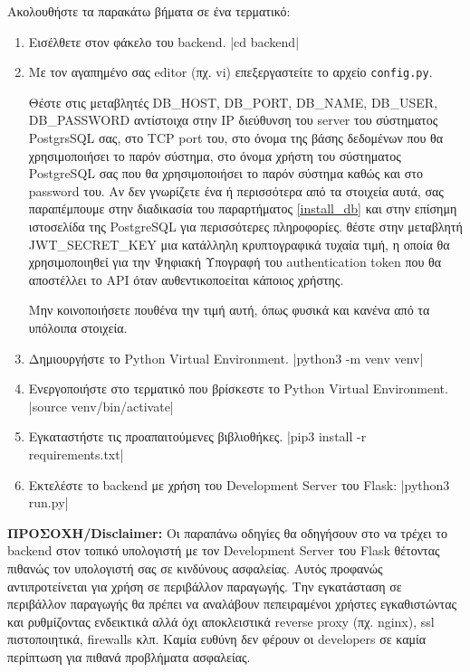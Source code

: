 \documentclass[a4paper]{article}
\begin{document}
\par Ακολουθήστε τα παρακάτω βήματα σε ένα τερματικό:
\begin{enumerate}
    \item Εισέλθετε στον φάκελο του backend.
        |cd backend|
    \item Με τον αγαπημένο σας editor (πχ. vi) επεξεργαστείτε το αρχείο \texttt{config.py}.
        \par Θέστε στις μεταβλητές DB\_HOST, DB\_PORT, DB\_NAME, DB\_USER, DB\_PASSWORD αντίστοιχα στην IP διεύθυνση του server του σύστηματος PostgrsSQL σας, στο TCP port του, στο όνομα της βάσης δεδομένων που θα χρησιμοποιήσει το παρόν σύστημα, στο όνομα χρήστη του σύστηματος PostgreSQL σας που θα χρησιμοποιήσει το παρόν σύστημα καθώς και στο password του. Αν δεν γνωρίζετε ένα ή περισσότερα από τα στοιχεία αυτά, σας παραπέμπουμε στην διαδικασία του παραρτήματος \ref{install_db} και στην επίσημη ιστοσελίδα της PostgreSQL για περισσότερες πληροφορίες.
         θέστε στην μεταβλητή JWT\_SECRET\_KEY μια κατάλληλη κρυπτογραφικά τυχαία τιμή, η οποία θα χρησιμοποιηθεί για την Ψηφιακή Υπογραφή του authentication token που θα αποστέλλει το API όταν αυθεντικοποείται κάποιος χρήστης.
        \par Μην κοινοποιήσετε πουθένα την τιμή αυτή, όπως φυσικά και κανένα από τα υπόλοιπα στοιχεία.
    \item Δημιουργήστε το Python Virtual Environment.
        |python3 -m venv venv|
    \item Ενεργοποιήστε στο τερματικό που βρίσκεστε το Python Virtual Environment.
        |source venv/bin/activate|
    \item Εγκαταστήστε τις προαπαιτούμενες βιβλιοθήκες.
        |pip3 install -r requirements.txt|
    \item Εκτελέστε το backend με χρήση του Development Server του Flask:
        |python3 run.py|
\end{enumerate}

\textbf{ΠΡΟΣΟΧΗ/Disclaimer:} Οι παραπάνω οδηγίες θα οδηγήσουν στο να τρέχει το backend στον τοπικό υπολογιστή με τον Development Server του Flask θέτοντας πιθανώς τον υπολογιστή σας σε κινδύνους ασφαλείας. Αυτός προφανώς αντιπροτείνεται για χρήση σε περιβάλλον παραγωγής. Την εγκατάσταση σε περιβάλλον παραγωγής θα πρέπει να αναλάβουν πεπειραμένοι χρήστες εγκαθιστώντας και ρυθμίζοντας ενδεικτικά αλλά όχι αποκλειστικά reverse proxy (πχ. nginx), ssl πιστοποιητικά, firewalls κλπ. Καμία ευθύνη δεν φέρουν οι developers σε καμία περίπτωση για πιθανά προβλήματα ασφαλείας.
\end{document}
